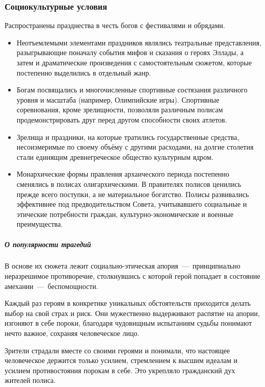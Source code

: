 \subsubsection{Социокультурные условия}

Распространены празднества в честь богов с фестивалями и обрядами.

\begin{itemize}
    \item Неотъемлемыми элементами праздников являлись театральные представления, разыгрывающие поначалу события мифов и сказания о героях Эллады, а затем и драматические произведения с самостоятельным сюжетом, которые постепенно выделились в отдельный жанр.
    \item Богам посвящались и многочисленные спортивные состязания различного уровня и масштаба (например, Олимпийские игры). Спортивные соревнования, кроме зрелищности, позволяли различным полисам продемонстрировать друг перед другом способности своих атлетов.
    \item Зрелища и праздники, на которые тратились государственные средства, несоизмеримые по своему объёму с другими расходами, на долгие столетия стали единящим древнегреческое общество культурным ядром.
    \item Монархические формы правления архаического периода постепенно сменялись в полисах олигархическими. В правителях полисов ценились прежде всего поступки, а не материальное богатство. Полисы развивались эффективнее под предводительством Совета, учитывавшего социальные и этические потребности граждан, культурно-экономические и военные преимущества.
\end{itemize}

\subparagraph{О популярности трагедий}

В основе их сюжета лежит социально-этическая апория~---~принципиально неразрешимое
противоречие, столкнувшись с которой герой попадает в состояние амехании~---~беспомощности.

Каждый раз героям в конкретике уникальных обстоятельств приходится делать выбор на свой страх и риск. Они мужественно выдерживают распятие на апории, изгоняют в себе пороки, благодаря чудовищным испытаниям судьбы понимают нечто важное, сохраняя человеческое лицо.

Зрители страдали вместе со своими героями и понимали, что настоящее человеческое держится только усилием, стремлением к высшим идеалам и усилием противостояния порокам в себе. Это укрепляло гражданский дух жителей полиса. 


